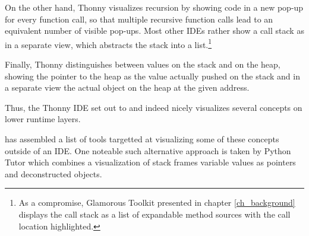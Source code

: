 On the other hand, Thonny visualizes recursion by showing code in a new pop-up for every function call, so that multiple recursive function calls lead to an equivalent number of visible pop-ups. Most other IDEs rather show a call stack as in a separate view, which abstracts the stack into a list.\footnote{As a compromise, Glamorous Toolkit presented in chapter \ref{ch_background} displays the call stack as a list of expandable method sources with the call location highlighted.}

Finally, Thonny distinguishes between values on the stack and on the heap, showing the pointer to the heap as the value actually pushed on the stack and in a separate view the actual object on the heap at the given address.

Thus, the Thonny IDE set out to and indeed nicely visualizes several concepts on lower runtime layers.

\cite{Jal22} has assembled a list of tools targetted at visualizing some of these concepts outside of an IDE. One noteable such alternative approach is taken by Python Tutor \citep{Pyt25} which combines a visualization of stack frames variable values as pointers and deconstructed objects.
